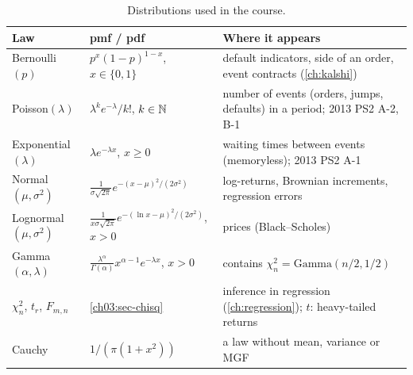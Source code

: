\begin{paracol}{2}
\begin{table}[ht]
\centering\small
\begin{tabularx}{\linewidth}{@{}l l L@{}}
\toprule
\textbf{Law} & \textbf{pmf / pdf} & \textbf{Where it appears}\\
\midrule
Bernoulli$(p)$ & $p^x(1-p)^{1-x}$, $x\in\{0,1\}$ & default indicators, side of an order, event contracts (\cref{ch:kalshi})\\
Poisson$(\lambda)$ & $\lambda^ke^{-\lambda}/k!$, $k\in\mathbb{N}$ & number of events (orders, jumps, defaults) in a period; 2013 PS2 A-2, B-1\\
Exponential$(\lambda)$ & $\lambda e^{-\lambda x}$, $x\ge0$ & waiting times between events (memoryless); 2013 PS2 A-1\\
Normal$(\mu,\sigma^2)$ & $\frac{1}{\sigma\sqrt{2\pi}}e^{-(x-\mu)^2/(2\sigma^2)}$ & log-returns, Brownian increments, regression errors\\
Lognormal$(\mu,\sigma^2)$ & $\frac{1}{x\sigma\sqrt{2\pi}}e^{-(\ln x-\mu)^2/(2\sigma^2)}$, $x>0$ & prices (Black--Scholes)\\
Gamma$(\alpha,\lambda)$ & $\frac{\lambda^\alpha}{\Gamma(\alpha)}x^{\alpha-1}e^{-\lambda x}$, $x>0$ & contains $\chi^2_n=\mathrm{Gamma}(n/2,1/2)$\\
$\chi^2_n$, $t_r$, $F_{m,n}$ & \cref{ch03:sec-chisq} & inference in regression (\cref{ch:regression}); $t$: heavy-tailed returns\\
Cauchy & $1/(\pi(1+x^2))$ & a law without mean, variance or MGF\\
\bottomrule
\end{tabularx}
\caption{Distributions used in the course.}\label{ch03:tab-laws}
\end{table}


\end{paracol}
